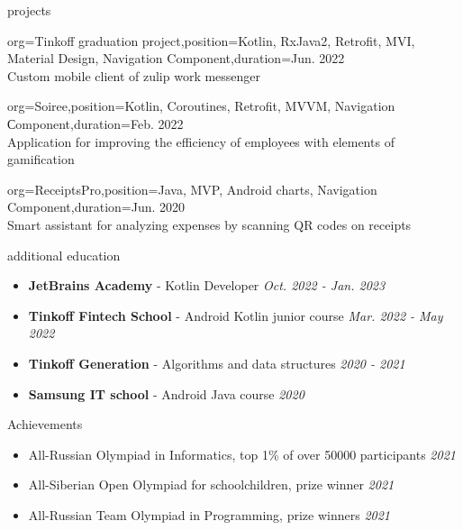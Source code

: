 \documentclass{resume}
\begin{document}
\begin{ResumeSection}{projects}
\begin{ResumeSubsection}{org=Tinkoff graduation project,position={Kotlin, RxJava2, Retrofit, MVI, Material Design, Navigation Component},duration={Jun. 2022}} \\
Custom mobile client of zulip work messenger \vspace{4}
\begin{itemize}
\end{itemize}
\end{ResumeSubsection}
\begin{ResumeSubsection}{org=Soiree,position={Kotlin, Coroutines, Retrofit, MVVM, Navigation Сomponent},duration={Feb. 2022}} \\
Application for improving the efficiency of employees with elements of gamification \vspace{4}
\begin{itemize}
\end{itemize}
\end{ResumeSubsection}
\begin{ResumeSubsection}{org=ReceiptsPro,position={Java, MVP, Android charts, Navigation Component},duration={Jun. 2020 \\}} 
Smart assistant for analyzing expenses by scanning QR codes on receipts
\begin{itemize}
\end{itemize}
\end{ResumeSubsection}
\end{ResumeSection}

\begin{ResumeSection}{additional education}
    \newcommand{\school}[2]{\textbf{#1} - #2}
    \begin{itemize}
        \item \school{JetBrains Academy}{Kotlin Developer} \em\hfill{Oct. 2022 - Jan. 2023}\em
        \item \school{Tinkoff Fintech School}{Android Kotlin junior course}  \em\hfill{Mar. 2022 - May 2022}\em
        \item \school{Tinkoff Generation}{Algorithms and data structures} \em\hfill{2020 - 2021}\em
        \item \school{Samsung IT school}{Android Java course} \em\hfill{2020}\em
    \end{itemize}
\end{ResumeSection}
\begin{ResumeSection}{Achievements}
\begin{itemize}
  \item All-Russian Olympiad in Informatics, top 1\% of over 50000 participants \em\hfill{2021}\em
  \item All-Siberian Open Olympiad for schoolchildren, prize winner \em\hfill{2021}\em
  \item All-Russian Team Olympiad in Programming, prize winners \em\hfill{2021}\em
\end{itemize}
\end{ResumeSection}
\end{document}
